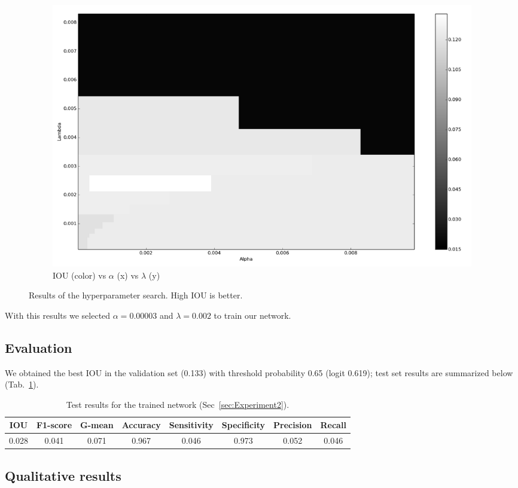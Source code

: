\begin{figure}[h]
\begin{subfigure}{0.32\textwidth}
		\centering
                \includegraphics[width=\textwidth]{plots/hs4_pcolor.png}
         \caption{IOU (color) vs $\alpha$ (x) vs $\lambda$ (y)}
	\end{subfigure}
	\caption[Hyperparameter search for Experiment 2]{Results of the hyperparameter search. High IOU is better.}
	 \label{fig:Hs4}
\end{figure}

With this results we selected $\alpha = 0.00003$ and $\lambda = 0.002$ to train our network.

\subsection{Evaluation}
We obtained the best IOU in the validation set (0.133) with threshold probability 0.65 (logit 0.619); test set results are summarized below (Tab.~\ref{tab:Results2}).
\begin{table}[h]
	\centering
	\begin{tabular}{cccccccc}
	\hline
	\textbf{IOU}	& \textbf{F1-score}	& \textbf{G-mean} &\textbf{Accuracy}	& \textbf{Sensitivity} & \textbf{Specificity} & \textbf{Precision} & \textbf{Recall}\\
	\hline
	 0.028 & 0.041 & 0.071 & 0.967 & 0.046 & 0.973 & 0.052 & 0.046\\
	\hline
	\end{tabular}
	\caption[Results for Experiment 2]{Test results for the trained network (Sec~\ref{sec:Experiment2}).}
	\label{tab:Results2}
\end{table}

\subsection{Qualitative results}



